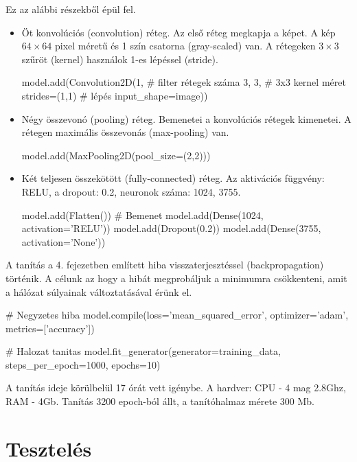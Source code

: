 Ez az alábbi részekből épül fel.
\begin{itemize}
\item Öt konvolúciós (convolution) réteg. Az első réteg megkapja a képet. A kép $64 \times 64$ pixel méretű és 1 szín csatorna (gray-scaled) van. A rétegeken $3 \times 3$ szűröt (kernel) használok 1-es lépéssel (stride).
\begin{python}
model.add(Convolution2D(1,	# filter rétegek száma    
                        3, 3,	# 3x3 kernel méret 
                        strides=(1,1) # lépés
                        input_shape=image))
\end{python}
\item Négy összevonó (pooling) réteg. Bemenetei a konvolúciós rétegek kimenetei. A rétegen maximális összevonás (max-pooling) van.
\begin{python}
model.add(MaxPooling2D(pool_size=(2,2)))
\end{python}
\item Két teljesen összekötött (fully-connected) réteg. Az aktivációs függvény: RELU, a dropout: 0.2, neuronok száma: 1024, 3755.
\begin{python}
model.add(Flatten()) # Bemenet
model.add(Dense(1024, activation='RELU'))
model.add(Dropout(0.2))
model.add(Dense(3755, activation='None'))
\end{python}
\end{itemize}

A tanítás a 4. fejezetben említett hiba visszaterjesztéssel (backpropagation) történik. A célunk az hogy a hibát megprobáljuk a minimumra csökkenteni, amit a hálózat súlyainak változtatásával érünk el.

\begin{python}
# Negyzetes hiba
model.compile(loss='mean_squared_error',
              optimizer='adam',
              metrics=['accuracy'])

# Halozat tanitas
model.fit_generator(generator=training_data,
                    steps_per_epoch=1000, epochs=10)
\end{python}

A tanítás ideje körülbelül 17 órát vett igénybe. A hardver: CPU - 4 mag 2.8Ghz, RAM - 4Gb. Tanítás 3200 epoch-ból állt, a tanítóhalmaz mérete 300 Mb.

\newpage

\section{Tesztelés}

